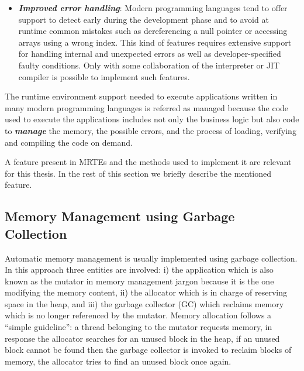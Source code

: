 \begin{itemize}
\item \textbf{\textit{Improved error handling}}:
Modern programming languages tend to offer support to detect early during the development phase and to avoid at runtime common mistakes such as dereferencing a null pointer or accessing arrays using a wrong index.
This kind of features requires extensive support for handling internal and unexpected errors as well as developer-specified faulty conditions.
Only with some collaboration of the interpreter or JIT compiler is possible to implement such features.
\end{itemize}   

The runtime environment support needed to execute applications written in many modern programming languages is referred as managed because the code used to execute the applications includes not only the business logic but also code to \textit{\textbf{manage}} the memory, the possible errors, and the process of loading, verifying and compiling the code on demand.

A feature present in MRTEs and the methods used to implement it are relevant for this thesis.
In the rest of this section we briefly describe the mentioned feature.

\subsection{Memory Management using Garbage Collection}

Automatic memory management is usually implemented using garbage collection.
In this approach three entities are involved: i) the application which is also known as the mutator in memory management jargon because it is the one modifying the memory content, ii) the allocator which is in charge of reserving space in the heap, and iii) the garbage collector (GC) which reclaims memory which is no longer referenced by the mutator.
Memory allocation follows a ``simple guideline'': a thread belonging to the mutator requests memory, in response the allocator searches for an unused block in the heap, if an unused block cannot be found then the garbage collector is invoked to reclaim blocks of memory, the allocator tries to find an unused block once again.

